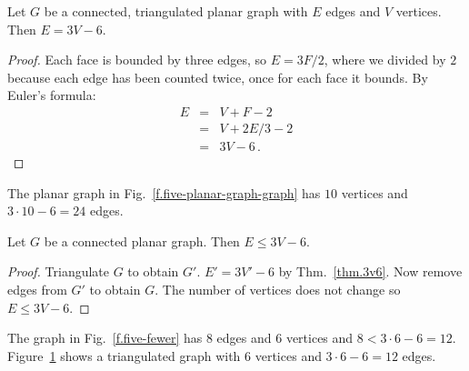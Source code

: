 \begin{theorem}\label{thm.3v6}
Let $G$ be a connected, triangulated planar graph with $E$ edges and $V$ vertices. Then $E= 3V-6$.
\end{theorem}
\begin{proof}
Each face is bounded by three edges, so $E=3F/2$, where we divided by $2$ because each edge has been counted twice, once for each face it bounds. By Euler's formula:
\begin{eqnarray*}
E&=&V+F-2\\
&=&V+2E/3-2\\
&=&3V-6\,.
\end{eqnarray*}
\end{proof}

\begin{example}
The planar graph in Fig.~\ref{f.five-planar-graph-graph} has $10$ vertices and $3\cdot 10-6=24$ edges.
\end{example}

\begin{theorem}\label{thm.count}
Let $G$ be a connected planar graph. Then $E\leq 3V-6$.
\end{theorem}

\begin{proof}
Triangulate $G$ to obtain $G'$. $E'= 3V'-6$ by Thm.~\ref{thm.3v6}. Now remove edges from $G'$ to obtain $G$. The number of vertices does not change so  $E\leq 3V-6$.
\end{proof}

\begin{example}
The graph in Fig.~\ref{f.five-fewer} has $8$ edges and $6$ vertices and $8< 3\cdot 6 - 6= 12$.
Figure~\ref{f.five-upper-limit} shows a triangulated graph with $6$ vertices and $3\cdot 6 - 6= 12$ edges.
\end{example}

\begin{figure}[t]
\subfigures
{}
\hfill
{}
\label{f.five-fewer}
\label{f.five-upper-limit}
\end{figure}

